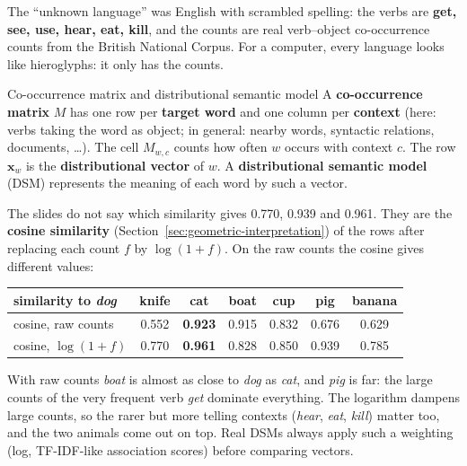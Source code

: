 The ``unknown language'' was English with scrambled spelling: the verbs are
\textbf{get, see, use, hear, eat, kill}, and the counts are real verb--object
co-occurrence counts from the British National Corpus. For a computer, every language
looks like hieroglyphs: it only has the counts.

\begin{nbdef}{Co-occurrence matrix and distributional semantic model}
A \textbf{co-occurrence matrix} $M$ has one row per \textbf{target word} and one column
per \textbf{context} (here: verbs taking the word as object; in general: nearby words,
syntactic relations, documents, \ldots). The cell $M_{w,c}$ counts how often $w$ occurs
with context $c$. The row $\mathbf{x}_w$ is the \textbf{distributional vector} of $w$.
A \textbf{distributional semantic model} (DSM) represents the meaning of each word by
such a vector.
\end{nbdef}

\begin{nbwarning}
The slides do not say which similarity gives 0.770, 0.939 and 0.961. They are the
\textbf{cosine similarity} (Section~\ref{sec:geometric-interpretation}) of the rows after
replacing each count $f$ by $\log(1+f)$. On the raw counts the cosine gives different
values:
\begin{center}
\small
\begin{tabular}{@{}l cccccc@{}}
\toprule
similarity to \emph{dog} & knife & cat & boat & cup & pig & banana \\
\midrule
cosine, raw counts          & 0.552 & \textbf{0.923} & 0.915 & 0.832 & 0.676 & 0.629 \\
cosine, $\log(1+f)$         & 0.770 & \textbf{0.961} & 0.828 & 0.850 & 0.939 & 0.785 \\
\bottomrule
\end{tabular}
\end{center}
With raw counts \emph{boat} is almost as close to \emph{dog} as \emph{cat}, and
\emph{pig} is far: the large counts of the very frequent verb \emph{get} dominate
everything. The logarithm dampens large counts, so the rarer but more telling contexts
(\emph{hear}, \emph{eat}, \emph{kill}) matter too, and the two animals come out on top.
Real DSMs always apply such a weighting (log, TF-IDF-like association scores) before
comparing vectors.
\end{nbwarning}

